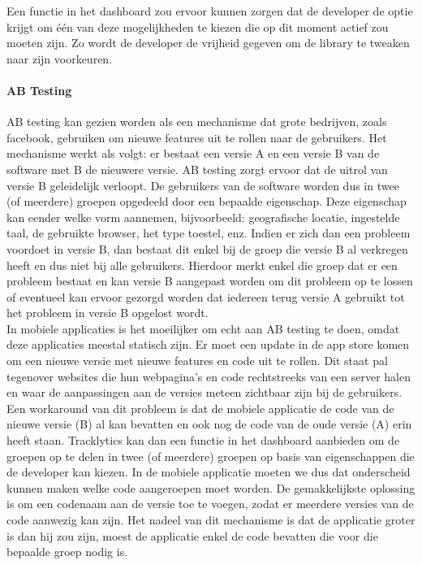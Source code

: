 Een functie in het dashboard zou ervoor kunnen zorgen dat de developer de optie krijgt om \'e\'en van deze mogelijkheden te kiezen die op dit moment actief zou moeten zijn. Zo wordt de developer de vrijheid gegeven om de library te tweaken naar zijn voorkeuren.

\paragraph{AB Testing}
AB testing kan gezien worden als een mechanisme dat grote bedrijven, zoals facebook, gebruiken om nieuwe features uit te rollen naar de gebruikers. Het mechanisme werkt als volgt: er bestaat een versie A en een versie B van de software met B de nieuwere versie. AB testing zorgt ervoor dat de uitrol van versie B geleidelijk verloopt. De gebruikers van de software worden dus in twee (of meerdere) groepen opgedeeld door een bepaalde eigenschap. Deze eigenschap kan eender welke vorm aannemen, bijvoorbeeld: geografische locatie, ingestelde taal, de gebruikte browser, het type toestel, enz. Indien er zich dan een probleem voordoet in versie B, dan bestaat dit enkel bij de groep die versie B al verkregen heeft en dus niet bij alle gebruikers. Hierdoor merkt enkel die groep dat er een probleem bestaat en kan versie B aangepast worden om dit probleem op te lossen of eventueel kan ervoor gezorgd worden dat iedereen terug versie A gebruikt tot het probleem in versie B opgelost wordt. \\

In mobiele applicaties is het moeilijker om echt aan AB testing te doen, omdat deze applicaties meestal statisch zijn. Er moet een update in de app store komen om een nieuwe versie met nieuwe features en code uit te rollen. Dit staat pal tegenover websites die hun webpagina's en code rechtstreeks van een server halen en waar de aanpassingen aan de versies meteen zichtbaar zijn bij de gebruikers. 
Een workaround van dit probleem is dat de mobiele applicatie de code van de nieuwe versie (B) al kan bevatten en ook nog de code van de oude versie (A) erin heeft staan. Tracklytics kan dan een functie in het dashboard aanbieden om de groepen op te delen in twee (of meerdere) groepen op basis van eigenschappen die de developer kan kiezen. In de mobiele applicatie moeten we dus dat onderscheid kunnen maken welke code aangeroepen moet worden. De gemakkelijkste oplossing is om een codenaam aan de versie toe te voegen, zodat er meerdere versies van de code aanwezig kan zijn. 
Het nadeel van dit mechanisme is dat de applicatie groter is dan hij zou zijn, moest de applicatie enkel de code bevatten die voor die bepaalde groep nodig is.


